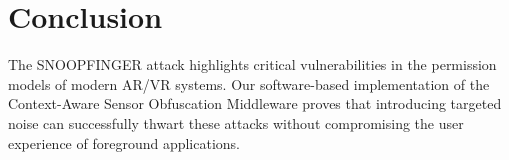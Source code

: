 \documentclass[12pt,a4paper]{article}
\begin{document}
\section{Conclusion}
The SNOOPFINGER attack highlights critical vulnerabilities in the permission models of modern AR/VR systems. Our software-based implementation of the Context-Aware Sensor Obfuscation Middleware proves that introducing targeted noise can successfully thwart these attacks without compromising the user experience of foreground applications.
\end{document}
